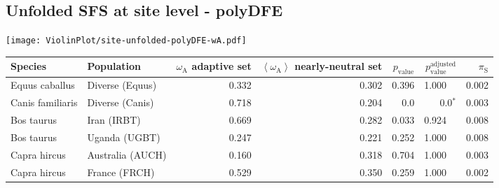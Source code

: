 \subsection{Unfolded SFS at site level - polyDFE} 
\begin{center}
\texttt{[image: ViolinPlot/site-unfolded-polyDFE-wA.pdf]} 
\begin{adjustbox}{width = 1\textwidth}
\begin{tabular}{|l|l|r|r|r|r|r|}
\toprule
             Species &                      Population & \specialcell{$\omega_{\mathrm{A}}$ \\ adaptive set} & \specialcell{$\left< \omega_{\mathrm{A}} \right>$ \\ nearly-neutral set} & $p_{\mathrm{value}}$ & $p_{\mathrm{value}}^{\mathrm{adjusted}}$ & $\pi_{\textrm{S}}$ \\
\midrule
      Equus caballus &                 Diverse (Equus) &                                              0.332 &                                              0.302 &                0.396 &                                  1.000~~ &              0.002 \\
    Canis familiaris &                 Diverse (Canis) &                                              0.718 &                                              0.204 &                  0.0 &                             0.0$\bm{^*}$ &              0.003 \\
          Bos taurus &                     Iran (IRBT) &                                              0.669 &                                              0.282 &                0.033 &                                  0.924~~ &              0.008 \\
          Bos taurus &                   Uganda (UGBT) &                                              0.247 &                                              0.221 &                0.252 &                                  1.000~~ &              0.008 \\
        Capra hircus &                Australia (AUCH) &                                              0.160 &                                              0.318 &                0.704 &                                  1.000~~ &              0.003 \\
        Capra hircus &                   France (FRCH) &                                              0.529 &                                              0.350 &                0.259 &                                  1.000~~ &              0.002 \\

\end{tabular}
\end{adjustbox}
\end{center}
